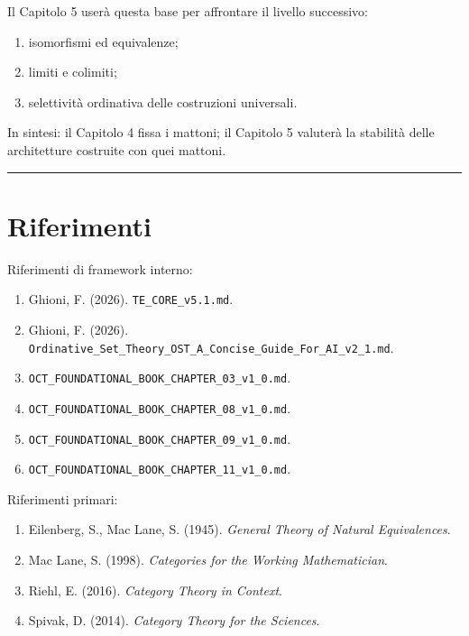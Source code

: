 Il Capitolo 5 userà questa base per affrontare il livello successivo:

\begin{enumerate}
\def\labelenumi{\arabic{enumi}.}
\tightlist
\item
  isomorfismi ed equivalenze;
\item
  limiti e colimiti;
\item
  selettività ordinativa delle costruzioni universali.
\end{enumerate}

In sintesi: il Capitolo 4 fissa i mattoni; il Capitolo 5 valuterà la stabilità delle architetture costruite con quei mattoni.

\begin{center}\rule{0.5\linewidth}{0.5pt}\end{center}

\section{Riferimenti}

Riferimenti di framework interno:

\begin{enumerate}
\def\labelenumi{\arabic{enumi}.}
\tightlist
\item
  Ghioni, F. (2026). \texttt{TE\_CORE\_v5.1.md}.
\item
  Ghioni, F. (2026). \texttt{Ordinative\_Set\_Theory\_OST\_A\_Concise\_Guide\_For\_AI\_v2\_1.md}.
\item
  \texttt{OCT\_FOUNDATIONAL\_BOOK\_CHAPTER\_03\_v1\_0.md}.
\item
  \texttt{OCT\_FOUNDATIONAL\_BOOK\_CHAPTER\_08\_v1\_0.md}.
\item
  \texttt{OCT\_FOUNDATIONAL\_BOOK\_CHAPTER\_09\_v1\_0.md}.
\item
  \texttt{OCT\_FOUNDATIONAL\_BOOK\_CHAPTER\_11\_v1\_0.md}.
\end{enumerate}

Riferimenti primari:

\begin{enumerate}
\def\labelenumi{\arabic{enumi}.}
\tightlist
\item
  Eilenberg, S., Mac Lane, S. (1945). \emph{General Theory of Natural Equivalences}.
\item
  Mac Lane, S. (1998). \emph{Categories for the Working Mathematician}.
\item
  Riehl, E. (2016). \emph{Category Theory in Context}.
\item
  Spivak, D. (2014). \emph{Category Theory for the Sciences}.
\end{enumerate}
